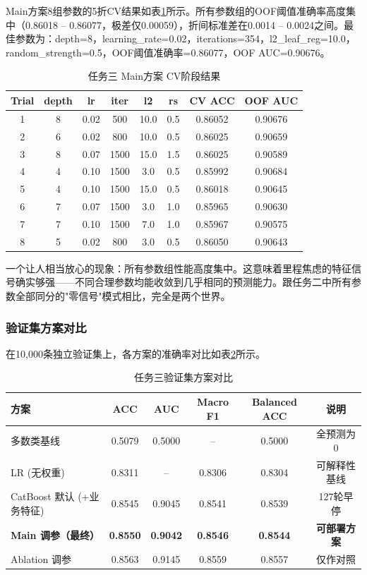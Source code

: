 Main方案8组参数的5折CV结果如表\ref{tab:t3_cv_main}所示。所有参数组的OOF阈值准确率高度集中（0.86018 -- 0.86077，极差仅0.00059），折间标准差在0.0014 -- 0.0024之间。最佳参数为：depth=8，learning\_rate=0.02，iterations=354，l2\_leaf\_reg=10.0，random\_strength=0.5，OOF阈值准确率=0.86077，OOF AUC=0.90676。

\begin{table}[H]
\centering
\caption{任务三 Main方案 CV阶段结果}
\label{tab:t3_cv_main}
\begin{tabular}{cccccccc}
\toprule
\textbf{Trial} & \textbf{depth} & \textbf{lr} & \textbf{iter} & \textbf{l2} & \textbf{rs} & \textbf{CV ACC} & \textbf{OOF AUC} \\
\midrule
1 & 8 & 0.02 & 500 & 10.0 & 0.5 & 0.86052 & 0.90676 \\
2 & 6 & 0.02 & 800 & 10.0 & 0.5 & 0.86025 & 0.90659 \\
3 & 8 & 0.07 & 1500 & 15.0 & 1.5 & 0.86025 & 0.90589 \\
4 & 4 & 0.10 & 1500 & 3.0 & 0.5 & 0.85992 & 0.90684 \\
5 & 4 & 0.10 & 1500 & 15.0 & 0.5 & 0.86018 & 0.90645 \\
6 & 7 & 0.07 & 1500 & 3.0 & 1.0 & 0.85965 & 0.90630 \\
7 & 7 & 0.10 & 1500 & 7.0 & 1.0 & 0.85967 & 0.90575 \\
8 & 5 & 0.02 & 800 & 3.0 & 0.5 & 0.86050 & 0.90643 \\
\bottomrule
\end{tabular}
\end{table}

一个让人相当放心的现象：所有参数组性能高度集中。这意味着里程焦虑的特征信号确实够强——不同合理参数均能收敛到几乎相同的预测能力。跟任务二中所有参数全部同分的"零信号"模式相比，完全是两个世界。

\subsubsection{验证集方案对比}

在10,000条独立验证集上，各方案的准确率对比如表\ref{tab:t3_results}所示。

\begin{table}[H]
\centering
\caption{任务三验证集方案对比}
\label{tab:t3_results}
\begin{tabular}{lccccc}
\toprule
\textbf{方案} & \textbf{ACC} & \textbf{AUC} & \textbf{Macro F1} & \textbf{Balanced ACC} & \textbf{说明} \\
\midrule
多数类基线 & 0.5079 & 0.5000 & -- & 0.5000 & 全预测为0 \\
LR (无权重) & 0.8311 & -- & 0.8306 & 0.8304 & 可解释性基线 \\
CatBoost 默认 (+业务特征) & 0.8545 & 0.9045 & 0.8541 & 0.8539 & 127轮早停 \\
\textbf{Main 调参（最终）} & \textbf{0.8550} & \textbf{0.9042} & \textbf{0.8546} & \textbf{0.8544} & \textbf{可部署方案} \\
Ablation 调参 & 0.8563 & 0.9145 & 0.8559 & 0.8557 & 仅作对照 \\
\bottomrule
\end{tabular}
\end{table}

